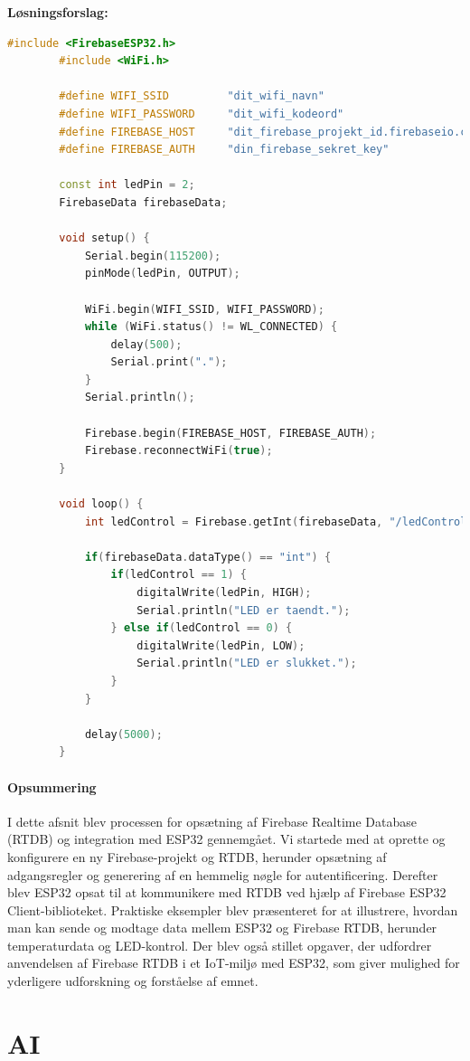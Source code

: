 \documentclass[12pt,a4paper]{book}
\begin{document}
	\textbf{Løsningsforslag:}
	\begin{lstlisting}[language=C++]
		#include <FirebaseESP32.h>
		#include <WiFi.h>
		
		#define WIFI_SSID         "dit_wifi_navn"
		#define WIFI_PASSWORD     "dit_wifi_kodeord"
		#define FIREBASE_HOST     "dit_firebase_projekt_id.firebaseio.com"
		#define FIREBASE_AUTH     "din_firebase_sekret_key"
		
		const int ledPin = 2;
		FirebaseData firebaseData;
		
		void setup() {
			Serial.begin(115200);
			pinMode(ledPin, OUTPUT);
			
			WiFi.begin(WIFI_SSID, WIFI_PASSWORD);
			while (WiFi.status() != WL_CONNECTED) {
				delay(500);
				Serial.print(".");
			}
			Serial.println();
			
			Firebase.begin(FIREBASE_HOST, FIREBASE_AUTH);
			Firebase.reconnectWiFi(true);
		}
		
		void loop() {
			int ledControl = Firebase.getInt(firebaseData, "/ledControl");
			
			if(firebaseData.dataType() == "int") {
				if(ledControl == 1) {
					digitalWrite(ledPin, HIGH);
					Serial.println("LED er taendt.");
				} else if(ledControl == 0) {
					digitalWrite(ledPin, LOW);
					Serial.println("LED er slukket.");
				}
			}
			
			delay(5000);
		}
	\end{lstlisting}
	\subsection*{Opsummering}
	I dette afsnit blev processen for opsætning af Firebase Realtime Database (RTDB) og integration med ESP32 gennemgået. Vi startede med at oprette og konfigurere en ny Firebase-projekt og RTDB, herunder opsætning af adgangsregler og generering af en hemmelig nøgle for autentificering. Derefter blev ESP32 opsat til at kommunikere med RTDB ved hjælp af Firebase ESP32 Client-biblioteket. Praktiske eksempler blev præsenteret for at illustrere, hvordan man kan sende og modtage data mellem ESP32 og Firebase RTDB, herunder temperaturdata og LED-kontrol. Der blev også stillet opgaver, der udfordrer anvendelsen af Firebase RTDB i et IoT-miljø med ESP32, som giver mulighed for yderligere udforskning og forståelse af emnet.	
	
	\part{AI}
\end{document}

